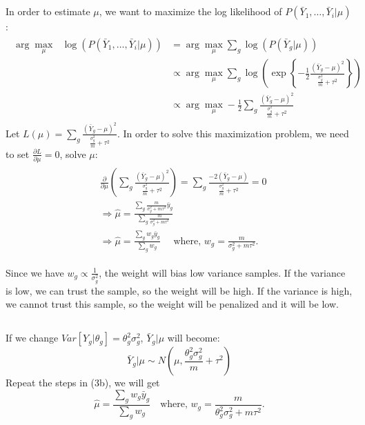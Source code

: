 \documentclass[paper=letter, fontsize=11pt]{scrartcl} %
\numberwithin{equation}{section} %
\numberwithin{figure}{section} %
\numberwithin{table}{section} %
\begin{document}
\subsection*{}
In order to estimate $\mu$, we want to maximize the log likelihood of $P(\bar{Y}_1,\dots,\bar{Y}_i|\mu)$:
\begin{align*}
\begin{split}
	\arg\max_{\mu} \text{ } \log( P(\bar{Y}_1,\dots,\bar{Y}_i|\mu)) &= \arg\max_{\mu} \sum_g \log(P(\bar{Y}_g|\mu)) \\
	&\propto \arg\max_{\mu} \sum_g \log\left(\exp\left\{-\frac{1}{2}\frac{(\bar{Y}_g - \mu)^2}{\frac{\sigma_g^2}{m} + \tau^2}\right\}\right) \\
	&\propto \arg\max_{\mu} -\frac{1}{2} \sum_g \frac{(\bar{Y}_g - \mu)^2}{\frac{\sigma_g^2}{m} + \tau^2}
\end{split}
\end{align*}
Let $L(\mu) = \sum_g \frac{(\bar{Y}_g - \mu)^2}{\frac{\sigma_g^2}{m} + \tau^2}$. In order to solve this maximization problem, we need to set $\frac{\partial L}{\partial \mu} = 0$, solve $\mu$:
\begin{align*}
\begin{split}
&\frac{\partial}{\partial \mu}\left( \sum_g \frac{(\bar{Y}_g - \mu)^2}{\frac{\sigma_g^2}{m} + \tau^2}  \right) =\sum_g \frac{-2(\bar{Y}_g - \mu)}{\frac{\sigma_g^2}{m} + \tau^2} =0 \\
&\Longrightarrow \hat{\mu} = \frac{\sum_g \frac{m}{\sigma_g^2 + m\tau^2} \bar{y}_g}{\sum_g \frac{m}{\sigma_g^2 + m\tau^2}} \\
&\Longrightarrow \hat{\mu} = \frac{\sum_g w_g \bar{y}_g}{\sum_g w_g } \quad \text{  where, } w_g = \frac{m}{\sigma_g^2 + m\tau^2}.
\end{split}
\end{align*}

Since we have $w_g \propto \frac{1}{\sigma_g^2}$, the weight will bias low variance samples. If the variance is low, we can trust the sample, so the weight will be high. If the variance is high, we cannot trust this sample, so the weight will be penalized and it will be low.

\subsection*{}
If we change $Var[Y_g|\theta_g] = \theta_g^2\sigma_g^2$, $\bar{Y}_g|\mu$ will become:
\[
\bar{Y}_g|\mu \sim N(\mu, \frac{\theta_g^2\sigma_g^2}{m} + \tau^2)
\]
Repeat the steps in (3b), we will get
\[
\hat{\mu} = \frac{\sum_g w_g \bar{y}_g}{\sum_g w_g } \quad \text{where, } w_g = \frac{m}{\theta_g^2\sigma_g^2 + m\tau^2}.
\]
\end{document}

